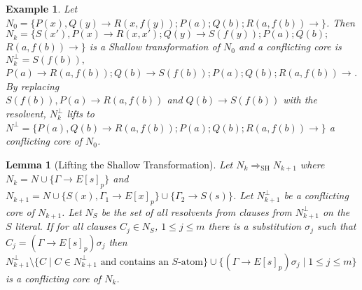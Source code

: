 \documentclass{llncs}
\newcommand{\imp}{\rightarrow}
\newtheorem{lem}[theorem]{Lemma}
\newtheorem{exmp}{Example}
\begin{document}
\begin{exmp}\label{LiftShallowEx}
Let $N_0 = \{ P(x), Q(y) \imp R(x,f(y)); P(a);Q(b); R(a,f(b))\imp \}$.
Then $N_k = \{ S(x'),P(x) \imp R(x,x'); Q(y) \imp S(f(y)); P(a);  Q(b); $ $ R(a,f(b)) \imp \}$ is a Shallow transformation of $N_0$
and  a conflicting core is $N^\bot_k= S(f(b)),$ $P(a) \imp R(a,f(b));Q(b) \imp S(f(b));P(a);  Q(b);  R(a,f(b)) \imp$.
By replacing \\
$S(f(b)),P(a) \imp R(a,f(b))$ and $Q(b) \imp S(f(b))$ with the resolvent, $N^\bot_k$ lifts to $N^\bot =\{ P(a), Q(b) \imp R(a,f(b)); P(a);Q(b);  R(a,f(b)) \imp\}$ a conflicting core of $N_0$.
\end{exmp} 

\begin{lem}[Lifting the Shallow Transformation]\label{liftshallow}
Let $N_k\Rightarrow_{\text{SH}} N_{k+1}$ where $N_k = N\cup\{\Gamma \imp E[s]_{p}\}$ and $N_{k+1} = N\cup\{S(x),\Gamma_1 \imp E[x]_{p}\}\cup\{ \Gamma_2 \imp S(s)\}$.
Let $N^\bot_{k+1}$ be a conflicting core of $N_{k+1}$. 
Let $N_S$ be the set of all resolvents from  clauses from $N^\bot_{k+1}$ on the $S$ literal.
If for all clauses $C_j\in N_S$, $1\leq j\leq m$ there is a substitution $\sigma_j$ such that $C_j = (\Gamma \imp E[s]_{p})\sigma_j$ then
$N^\bot_{k+1}\setminus\{C\mid C\in N^\bot_{k+1}\text{ and contains an }S\text{-atom}\}\cup\{(\Gamma \imp E[s]_{p})\sigma_j\mid 1\leq j\leq m\}$ is a conflicting core of $N_k$.
\end{lem}
\end{document}
